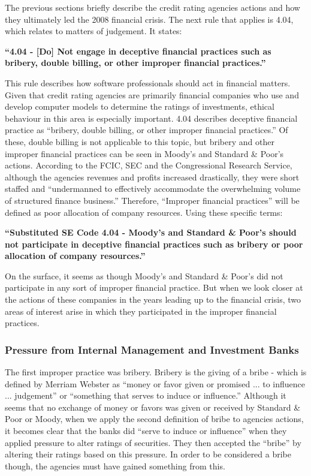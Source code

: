 \documentclass[11pt]{article}
\begin{document}
\begin{multicols}{2}
The previous sections briefly describe the credit rating agencies actions and how they ultimately led the 2008 financial crisis.  The next rule that applies is 4.04, which relates to matters of judgement.  It states:


   \textbf{``4.04 - [Do] Not engage in deceptive financial practices such as bribery, double billing, or other improper financial practices.''}


This rule describes how software professionals should act in financial matters.  Given that credit rating agencies are primarily financial companies who use and develop computer models to determine the ratings of investments, ethical behaviour in this area is especially important.  
4.04 describes deceptive financial practice as ``bribery, double billing, or other improper financial practices.''  Of these, double billing is not applicable to this topic, but bribery and other improper financial practices can be seen in Moody's and Standard \& Poor's actions.  According to the FCIC, SEC and the Congressional Research Service, although the agencies revenues and profits increased drastically, they were short staffed and ``undermanned to effectively accommodate the overwhelming volume of structured finance business.'' \cite[pg. 7]{CRS, govtReport, secCRAreport} Therefore, ``Improper financial practices'' will be defined as poor allocation of company resources.  
Using these specific terms:


   \textbf{``Substituted SE Code 4.04 - Moody's and Standard \& Poor's should not participate in deceptive financial practices such as bribery or poor allocation of company resources.''}


On the surface, it seems as though Moody's and Standard \& Poor's did not participate in any sort of improper financial practice.  But when we look closer at the actions of these companies in the years leading up to the financial crisis, two areas of interest arise in which they participated in the improper financial practices.  

\subsubsection{\textbf{Pressure from Internal Management and Investment Banks}}

The first improper practice was bribery.  Bribery is the giving of a bribe - which is defined by Merriam Webster as ``money or favor given or promised ... to influence ... judgement'' or ``something that serves to induce or influence.'' \cite{bribeDef}  Although it seems that no exchange of money or favors was given or received by Standard \& Poor or Moody, when we apply the second definition of bribe to agencies actions, it becomes clear that the banks did ``serve to induce or influence'' when they applied pressure to alter ratings of securities.  They then accepted the ``bribe'' by altering their ratings based on this pressure.  In order to be considered a bribe though, the agencies must have gained something from this.


\end{multicols}
\end{document}

